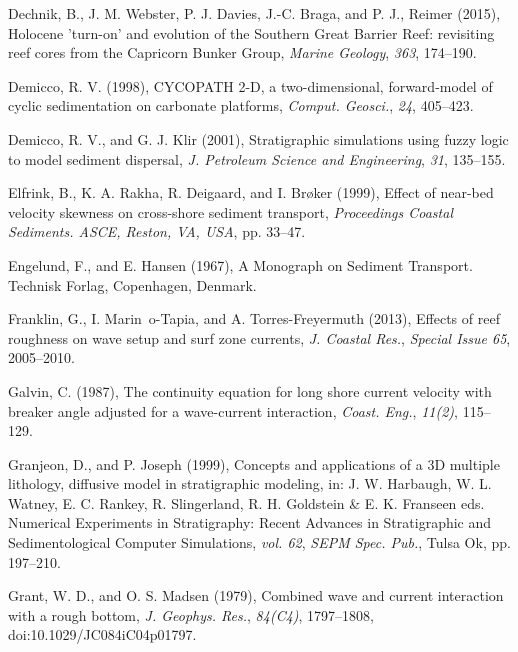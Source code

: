 \documentclass[default,jgrga]{agutex2015}
\begin{document}
\begin{article}
\begin{thebibliography}{}
Dechnik, B., J. M. Webster, P. J. Davies, J.-C. Braga, and P. J., Reimer (2015), Holocene 'turn-on' and evolution of the Southern Great Barrier Reef: revisiting reef cores from the Capricorn Bunker Group, \textit{Marine Geology}, \textit{363}, 174--190.

Demicco, R. V. (1998), CYCOPATH 2-D, a two-dimensional, forward-model of cyclic sedimentation on carbonate platforms, \textit{Comput. Geosci.}, \textit{24}, 405--423.

Demicco, R. V., and G. J. Klir (2001), Stratigraphic simulations using fuzzy logic to model sediment dispersal, \textit{J. Petroleum Science and Engineering}, \textit{31}, 135--155.

Elfrink, B., K. A. Rakha, R. Deigaard, and I. Br{\o}ker (1999), Effect of near-bed velocity skewness on cross-shore sediment transport,  \textit{Proceedings Coastal Sediments. ASCE, Reston, VA, USA}, pp. 33--47.

Engelund, F., and E. Hansen (1967), A Monograph on Sediment Transport. Technisk Forlag, Copenhagen, Denmark.

Franklin, G., I. Marin~o-Tapia, and A. Torres-Freyermuth (2013), Effects of reef roughness on wave setup and surf zone currents, \textit{J. Coastal Res.}, \textit{Special Issue 65}, 2005--2010.

Galvin, C. (1987), The continuity equation for long shore current velocity with breaker angle adjusted for a wave-current interaction, \textit{Coast. Eng.}, \textit{11(2)}, 115--129.

Granjeon, D., and P. Joseph (1999), Concepts and applications of a 3D multiple lithology, diffusive model in stratigraphic modeling, in: J. W. Harbaugh, W. L. Watney, E. C. Rankey, R. Slingerland, R. H. Goldstein \& E. K. Franseen eds. Numerical Experiments in Stratigraphy: Recent Advances in Stratigraphic and Sedimentological Computer Simulations, \textit{vol. 62}, \textit{SEPM Spec. Pub.}, Tulsa Ok, pp. 197--210.

Grant, W. D., and O. S. Madsen (1979), Combined wave and current interaction with a rough bottom, \textit{J. Geophys. Res.}, \textit{84(C4)}, 1797--1808, doi:10.1029/JC084iC04p01797.


\end{thebibliography}
\end{article}
\end{document}
